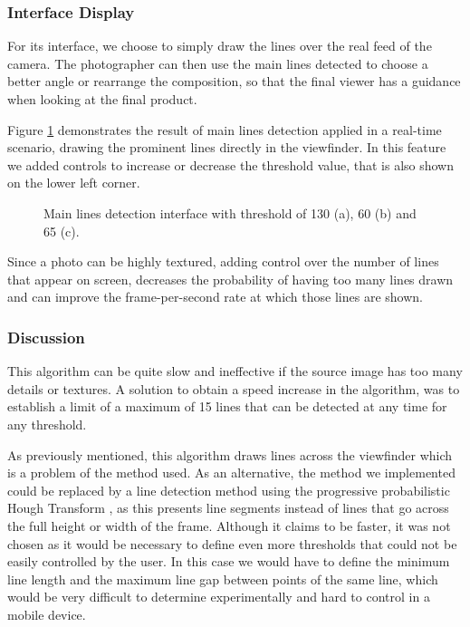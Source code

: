 \subsubsection{Interface Display}

For its interface, we choose to simply draw the lines over the real feed of the camera. The photographer can then use the main lines detected to choose a better angle or rearrange the composition, so that the final viewer has a guidance when looking at the final product.

Figure \ref{fig:mainline_interface} demonstrates the result of main lines detection applied in a real-time scenario, drawing the prominent lines directly in the viewfinder. In this feature we added controls to increase or decrease the threshold value, that is also shown on the lower left corner.

\begin{figure}[htbp]
	\centering
	\begin{minipage}[b]{\textwidth}
  		\centering
  	\end{minipage}
  	\caption{Main lines detection interface with threshold of 130 (a), 60 (b) and 65 (c).}    				\label{fig:mainline_interface}
\end{figure}

Since a photo can be highly textured, adding control over the number of lines that appear on screen, decreases the probability of having too many lines drawn and can improve the frame-per-second rate at which those lines are shown.

\subsubsection{Discussion}

This algorithm can be quite slow and ineffective if the source image has too many details or textures. A solution to obtain a speed increase in the algorithm, was to establish a limit of a maximum of 15 lines that can be detected at any time for any threshold.

As previously mentioned, this algorithm draws lines across the viewfinder which is a problem of the method used. As an alternative, the method we implemented could be replaced by a line detection method using the progressive probabilistic Hough Transform \cite{matas2000robust}, as this presents line segments instead of lines that go across the full height or width of the frame. Although it claims to be faster, it was not chosen as it would be necessary to define even more thresholds that could not be easily controlled by the user. In this case we would have to define the minimum line length and the maximum line gap between points of the same line, which would be very difficult to determine experimentally and hard to control in a mobile device.

